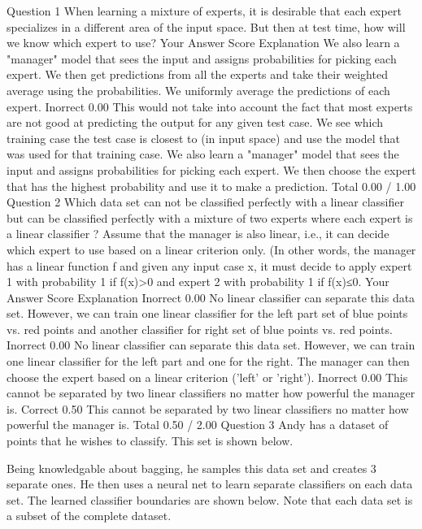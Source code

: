 Question 1
When learning a mixture of experts, it is desirable that each expert specializes in a different area of the input space. But then at test time, how will we know which expert to use?
Your Answer		Score	Explanation
We also learn a "manager" model that sees the input and assigns probabilities for picking each expert. We then get predictions from all the experts and take their weighted average using the probabilities.			
We uniformly average the predictions of each expert.	Inorrect	0.00	This would not take into account the fact that most experts are not good at predicting the output for any given test case.
We see which training case the test case is closest to (in input space) and use the model that was used for that training case.			
We also learn a "manager" model that sees the input and assigns probabilities for picking each expert. We then choose the expert that has the highest probability and use it to make a prediction.			
Total		0.00 / 1.00	
Question 2
Which data set can not be classified perfectly with a linear classifier but can be classified perfectly with a mixture of two experts where each expert is a linear classifier ? 
Assume that the manager is also linear, i.e., it can decide which expert to use based on a linear criterion only. (In other words, the manager has a linear function f and given any input case x, it must decide to apply expert 1 with probability 1 if f(x)>0 and expert 2 with probability 1 if f(x)≤0.
Your Answer		Score	Explanation
	Inorrect	0.00	No linear classifier can separate this data set. However, we can train one linear classifier for the left part set of blue points vs. red points and another classifier for right set of blue points vs. red points.
	Inorrect	0.00	No linear classifier can separate this data set. However, we can train one linear classifier for the left part and one for the right. The manager can then choose the expert based on a linear criterion ('left' or 'right').
	Inorrect	0.00	This cannot be separated by two linear classifiers no matter how powerful the manager is.
	Correct	0.50	This cannot be separated by two linear classifiers no matter how powerful the manager is.
Total		0.50 / 2.00	
Question 3
Andy has a dataset of points that he wishes to classify. This set is shown below.

Being knowledgable about bagging, he samples this data set and creates 3 separate ones. He then uses a neural net to learn separate classifiers on each data set. The learned classifier boundaries are shown below. Note that each data set is a subset of the complete dataset. 

